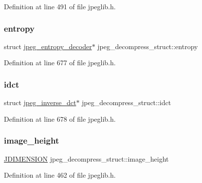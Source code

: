 Definition at line 491 of file jpeglib.\+h.

\mbox{\label{structjpeg__decompress__struct_ac53f055b3d8103caa6c7ba4b4975eb5b}} 
\subsubsection{\texorpdfstring{entropy}{entropy}}
{\footnotesize\ttfamily struct \mbox{\hyperlink{structjpeg__entropy__decoder}{jpeg\+\_\+entropy\+\_\+decoder}}$\ast$ jpeg\+\_\+decompress\+\_\+struct\+::entropy}



Definition at line 677 of file jpeglib.\+h.

\mbox{\label{structjpeg__decompress__struct_a2ef67a2829f8ecebb1af0ed440bff8bf}} 
\subsubsection{\texorpdfstring{idct}{idct}}
{\footnotesize\ttfamily struct \mbox{\hyperlink{structjpeg__inverse__dct}{jpeg\+\_\+inverse\+\_\+dct}}$\ast$ jpeg\+\_\+decompress\+\_\+struct\+::idct}



Definition at line 678 of file jpeglib.\+h.

\mbox{\label{structjpeg__decompress__struct_ad711fae8063a3e75e3c0cccd8512bedf}} 
\subsubsection{\texorpdfstring{image\_height}{image\_height}}
{\footnotesize\ttfamily \mbox{\hyperlink{jmorecfg_8h_a04ed4674f6f1d0d50ec241531e38274f}{J\+D\+I\+M\+E\+N\+S\+I\+ON}} jpeg\+\_\+decompress\+\_\+struct\+::image\+\_\+height}



Definition at line 462 of file jpeglib.\+h.

